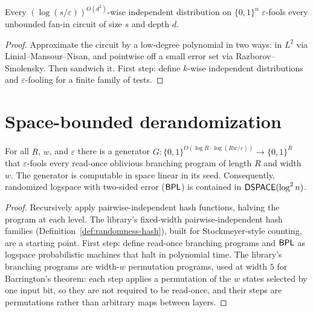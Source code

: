 \begin{theorem}
  \label{thm:frontiers-braverman}
  \notready
  Every $(\log(s/\varepsilon))^{O(d^2)}$-wise independent distribution on
  $\{0,1\}^n$ $\varepsilon$-fools every unbounded fan-in circuit of size $s$ and
  depth $d$.
\end{theorem}
\begin{proof}
  Approximate the circuit by a low-degree polynomial in two ways: in $L^2$ via
  Linial--Mansour--Nisan, and pointwise off a small error set via
  Razborov--Smolensky. Then sandwich it. First step: define $k$-wise independent
  distributions and $\varepsilon$-fooling for a finite family of tests.
\end{proof}

\section{Space-bounded derandomization}

\begin{theorem}
  \label{thm:frontiers-nisan}
  \notready
  For all $R$, $w$, and $\varepsilon$ there is a generator
  $G : \{0,1\}^{O(\log R \cdot \log(Rw/\varepsilon))} \to \{0,1\}^R$ that
  $\varepsilon$-fools every read-once oblivious branching program of length $R$
  and width $w$. The generator is computable in space linear in its seed.
  Consequently, randomized logspace with two-sided error ($\mathsf{BPL}$) is contained
  in $\mathsf{DSPACE}(\log^2 n)$.
\end{theorem}
\begin{proof}
  Recursively apply pairwise-independent hash functions, halving the program at
  each level. The library's fixed-width pairwise-independent hash families
  (Definition~\ref{def:randomness-hash}), built for Stockmeyer-style counting,
  are a starting point. First step: define read-once branching programs and
  $\mathsf{BPL}$ as logspace probabilistic machines that halt in polynomial time.
  The library's branching programs are width-$w$ permutation programs, used at
  width $5$ for Barrington's theorem: each step applies a permutation of the
  $w$ states selected by one input bit, so they are not required to be
  read-once, and their steps are permutations rather than arbitrary maps
  between layers.
\end{proof}

